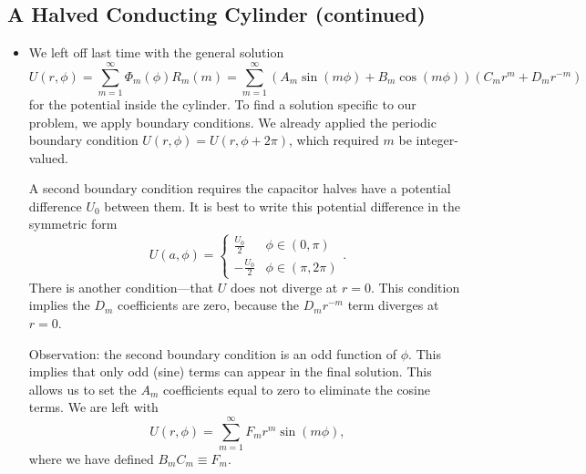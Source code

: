 \documentclass[11pt, a4paper]{article}
\begin{document}
\subsection{A Halved Conducting Cylinder (continued)}
\begin{itemize}	
		
	\item We left off last time with the general solution
	\begin{equation*}
		U(r, \phi) = \sum_{m = 1}^{\infty}\Phi_{m}(\phi)R_{m}(m) = \sum_{m = 1}^{\infty} \left(A_{m} \sin(m\phi) + B_{m}\cos(m\phi)\right)\left( C_{m}r^{m} + D_{m}r^{-m} \right)
	\end{equation*}
	for the potential inside the cylinder. To find a solution specific to our problem, we apply boundary conditions. We already applied the periodic boundary condition $ U(r, \phi) = U(r, \phi + 2\pi) $, which required $ m $ be integer-valued.
	
	
	A second boundary condition requires the capacitor halves have a potential difference $ U_{0} $ between them. It is best to write this potential difference in the symmetric form
	\begin{equation*}
		U(a, \phi) = 
		\begin{cases}
			\frac{U_{0}}{2} & \phi \in (0, \pi)\\
			-\frac{U_{0}}{2} & \phi \in (\pi, 2\pi)
		\end{cases}.
	\end{equation*}
	There is another condition---that $ U $ does not diverge at $ r = 0 $. This condition implies the $ D_{m} $ coefficients are zero, because the $ D_{m}r^{-m} $ term diverges at $ r = 0 $. 
	
	Observation: the second boundary condition is an odd function of $ \phi $. This implies that only odd (sine) terms can appear in the final solution. This allows us to set the $ A_{m} $ coefficients equal to zero to eliminate the cosine terms. We are left with
	\begin{equation*}
		U(r, \phi) = \sum_{m=1}^{\infty} F_{m}r^{m} \sin (m\phi),
	\end{equation*}
	where we have defined $ B_{m}C_{m} \equiv F_{m} $. 
	

\end{itemize}
\end{document}
